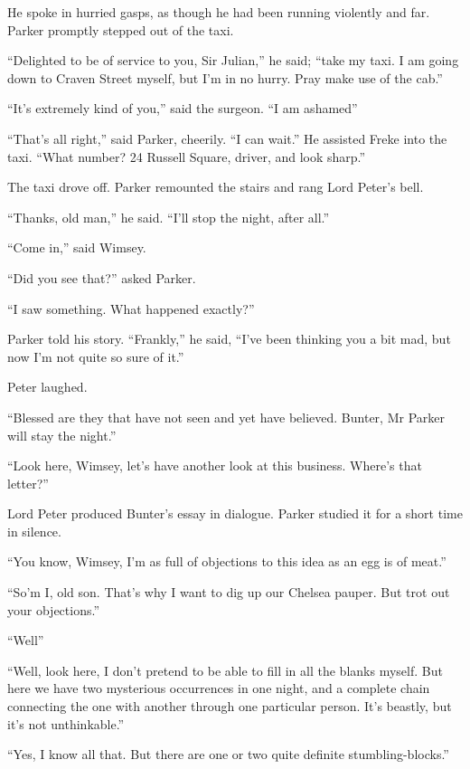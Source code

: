 He spoke in hurried gasps, as though he had been running violently and far. Parker promptly stepped out of the taxi.

\enquote{Delighted to be of service to you, Sir Julian,} he said; \enquote{take my taxi. I am going down to Craven Street myself, but I’m in no hurry. Pray make use of the cab.}

\enquote{It’s extremely kind of you,} said the surgeon. \enquote{I am ashamed\longdash}

\enquote{That’s all right,} said Parker, cheerily. \enquote{I can wait.} He assisted Freke into the taxi. \enquote{What number? 24 Russell Square, driver, and look sharp.}

The taxi drove off. Parker remounted the stairs and rang Lord Peter’s bell.

\enquote{Thanks, old man,} he said. \enquote{I’ll stop the night, after all.}

\enquote{Come in,} said Wimsey.

\enquote{Did you see that?} asked Parker.

\enquote{I saw something. What happened exactly?}

Parker told his story. \enquote{Frankly,} he said, \enquote{I’ve been thinking you a bit mad, but now I’m not quite so sure of it.}

Peter laughed.

\enquote{Blessed are they that have not seen and yet have believed. Bunter, Mr Parker will stay the night.}

\enquote{Look here, Wimsey, let’s have another look at this business. Where’s that letter?}

Lord Peter produced Bunter’s essay in dialogue. Parker studied it for a short time in silence.

\enquote{You know, Wimsey, I’m as full of objections to this idea as an egg is of meat.}

\enquote{So’m I, old son. That’s why I want to dig up our Chelsea pauper. But trot out your objections.}

\enquote{Well\longdash}

\enquote{Well, look here, I don’t pretend to be able to fill in all the blanks myself. But here we have two mysterious occurrences in one night, and a complete chain connecting the one with another through one particular person. It’s beastly, but it’s not unthinkable.}

\enquote{Yes, I know all that. But there are one or two quite definite stumbling-blocks.}


